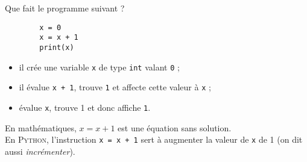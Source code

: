 \documentclass{nsibook}
\begin{document}
Que fait le programme suivant ?

\begin{pyc}
	\begin{verbatim}
		x = 0
		x = x + 1
		print(x)    
	\end{verbatim}
\end{pyc}

\begin{itemize}
	\item il crée une variable \texttt{x} de type \texttt{int} valant \texttt{0} ;
    \item il évalue \texttt{x + 1}, trouve \texttt{1} et affecte cette valeur à \texttt{x} ;
    \item évalue \texttt{x}, trouve 1 et donc affiche \texttt{1}.
\end{itemize}

\begin{aretenir}
	En mathématiques, $x = x + 1$ est une équation sans solution.\\

	En \textsc{Python}, l'instruction \texttt{x = x + 1} sert à augmenter la valeur de \texttt{x} de 1 (on dit aussi \textit{incrémenter}).
\end{aretenir}
\end{document}
